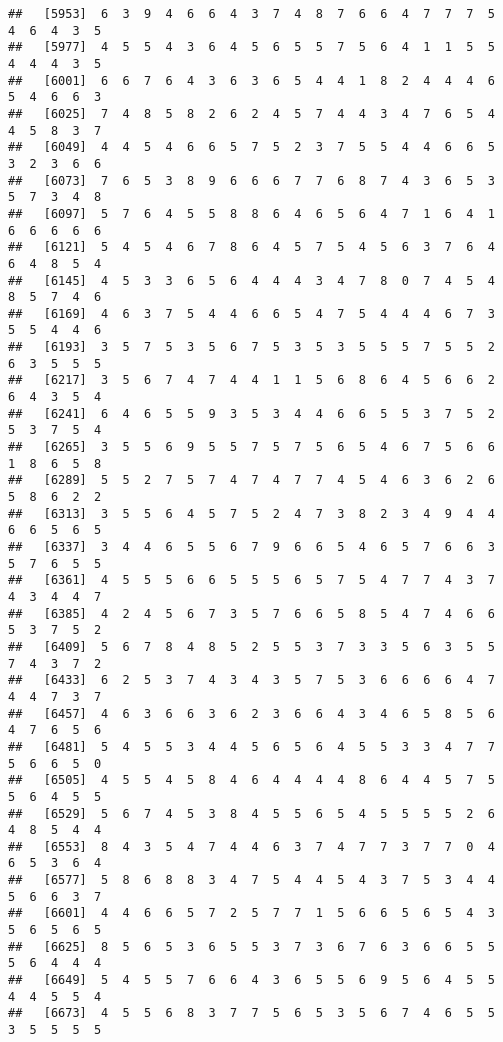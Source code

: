\documentclass[
]{book}
\begin{document}
\begin{verbatim}
##   [5953]  6  3  9  4  6  6  4  3  7  4  8  7  6  6  4  7  7  7  5  4  6  4  3  5
##   [5977]  4  5  5  4  3  6  4  5  6  5  5  7  5  6  4  1  1  5  5  4  4  4  3  5
##   [6001]  6  6  7  6  4  3  6  3  6  5  4  4  1  8  2  4  4  4  6  5  4  6  6  3
##   [6025]  7  4  8  5  8  2  6  2  4  5  7  4  4  3  4  7  6  5  4  4  5  8  3  7
##   [6049]  4  4  5  4  6  6  5  7  5  2  3  7  5  5  4  4  6  6  5  3  2  3  6  6
##   [6073]  7  6  5  3  8  9  6  6  6  7  7  6  8  7  4  3  6  5  3  5  7  3  4  8
##   [6097]  5  7  6  4  5  5  8  8  6  4  6  5  6  4  7  1  6  4  1  6  6  6  6  6
##   [6121]  5  4  5  4  6  7  8  6  4  5  7  5  4  5  6  3  7  6  4  6  4  8  5  4
##   [6145]  4  5  3  3  6  5  6  4  4  4  3  4  7  8  0  7  4  5  4  8  5  7  4  6
##   [6169]  4  6  3  7  5  4  4  6  6  5  4  7  5  4  4  4  6  7  3  5  5  4  4  6
##   [6193]  3  5  7  5  3  5  6  7  5  3  5  3  5  5  5  7  5  5  2  6  3  5  5  5
##   [6217]  3  5  6  7  4  7  4  4  1  1  5  6  8  6  4  5  6  6  2  6  4  3  5  4
##   [6241]  6  4  6  5  5  9  3  5  3  4  4  6  6  5  5  3  7  5  2  5  3  7  5  4
##   [6265]  3  5  5  6  9  5  5  7  5  7  5  6  5  4  6  7  5  6  6  1  8  6  5  8
##   [6289]  5  5  2  7  5  7  4  7  4  7  7  4  5  4  6  3  6  2  6  5  8  6  2  2
##   [6313]  3  5  5  6  4  5  7  5  2  4  7  3  8  2  3  4  9  4  4  6  6  5  6  5
##   [6337]  3  4  4  6  5  5  6  7  9  6  6  5  4  6  5  7  6  6  3  5  7  6  5  5
##   [6361]  4  5  5  5  6  6  5  5  5  6  5  7  5  4  7  7  4  3  7  4  3  4  4  7
##   [6385]  4  2  4  5  6  7  3  5  7  6  6  5  8  5  4  7  4  6  6  5  3  7  5  2
##   [6409]  5  6  7  8  4  8  5  2  5  5  3  7  3  3  5  6  3  5  5  7  4  3  7  2
##   [6433]  6  2  5  3  7  4  3  4  3  5  7  5  3  6  6  6  6  4  7  4  4  7  3  7
##   [6457]  4  6  3  6  6  3  6  2  3  6  6  4  3  4  6  5  8  5  6  4  7  6  5  6
##   [6481]  5  4  5  5  3  4  4  5  6  5  6  4  5  5  3  3  4  7  7  5  6  6  5  0
##   [6505]  4  5  5  4  5  8  4  6  4  4  4  4  8  6  4  4  5  7  5  5  6  4  5  5
##   [6529]  5  6  7  4  5  3  8  4  5  5  6  5  4  5  5  5  5  2  6  4  8  5  4  4
##   [6553]  8  4  3  5  4  7  4  4  6  3  7  4  7  7  3  7  7  0  4  6  5  3  6  4
##   [6577]  5  8  6  8  8  3  4  7  5  4  4  5  4  3  7  5  3  4  4  5  6  6  3  7
##   [6601]  4  4  6  6  5  7  2  5  7  7  1  5  6  6  5  6  5  4  3  5  6  5  6  5
##   [6625]  8  5  6  5  3  6  5  5  3  7  3  6  7  6  3  6  6  5  5  5  6  4  4  4
##   [6649]  5  4  5  5  7  6  6  4  3  6  5  5  6  9  5  6  4  5  5  4  4  5  5  4
##   [6673]  4  5  5  6  8  3  7  7  5  6  5  3  5  6  7  4  6  5  5  3  5  5  5  5

\end{verbatim}
\end{document}
